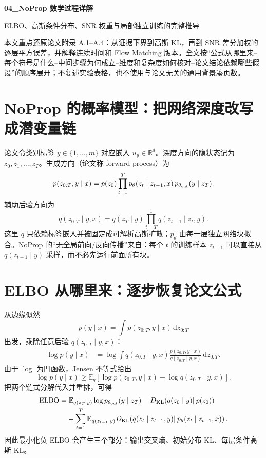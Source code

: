 \documentclass[UTF8,12pt,a4paper,fontset=none]{ctexart}
\numberwithin{equation}{section}
\newcommand{\R}{\mathbb{R}}
\newcommand{\E}{\mathbb{E}}
\newcommand{\KL}{D_{\mathrm{KL}}}
\newcommand{\dd}{\mathrm{d}}
\begin{document}
\begin{center}
{\LARGE\bfseries 04\_NoProp 数学过程详解}\par
\vspace{0.35em}
{\large ELBO、高斯条件分布、SNR 权重与局部独立训练的完整推导}
\end{center}
\vspace{0.45em}
\begin{keybox}[本文只处理真正需要推导的部分]
本文重点还原论文附录 A.1--A.4：从证据下界到高斯 KL，再到 SNR 差分加权的逐层平方误差，并解释连续时间和 Flow Matching 版本。全文按“公式从哪里来--每个符号是什么--中间步骤为何成立--维度和复杂度如何核对--论文结论依赖哪些假设”的顺序展开；不复述实验表格，也不使用与论文无关的通用背景凑页数。
\end{keybox}
\tableofcontents
\newpage

\section{NoProp 的概率模型：把网络深度改写成潜变量链}
论文令类别标签 $y\in\{1,\ldots,m\}$ 对应嵌入 $u_y\in\R^d$。深度方向的隐状态记为 $z_0,z_1,\ldots,z_T$。生成方向（论文称 forward process）为
\begin{equation}
 p(z_{0:T},y\mid x)=p(z_0)\prod_{t=1}^{T}p_\theta(z_t\mid z_{t-1},x)\,p_{\theta_{\rm out}}(y\mid z_T).
\end{equation}
辅助后验方向为
\begin{equation}
 q(z_{0:T}\mid y,x)=q(z_T\mid y)\prod_{t=T}^{1}q(z_{t-1}\mid z_t,y).
\end{equation}
这里 $q$ 只依赖标签嵌入并被固定成可解析高斯扩散；$p_\theta$ 由每一层独立网络块拟合。NoProp 的“无全局前向/反向传播”来自：每个 $t$ 的训练样本 $z_{t-1}$ 可以直接从 $q(z_{t-1}\mid y)$ 采样，而不必先运行前面所有块。

\section{ELBO 从哪里来：逐步恢复论文公式}
从边缘似然
\begin{equation}
 p(y\mid x)=\int p(z_{0:T},y\mid x)\,\dd z_{0:T}
\end{equation}
出发，乘除任意后验 $q(z_{0:T}\mid y,x)$：
\begin{align}
 \log p(y\mid x)
 &=\log\int q(z_{0:T}\mid y,x)
 \frac{p(z_{0:T},y\mid x)}{q(z_{0:T}\mid y,x)}\,\dd z_{0:T}.
\end{align}
由于 $\log$ 为凹函数，Jensen 不等式给出
\begin{equation}
 \boxed{\log p(y\mid x)\ge
 \E_q\left[\log p(z_{0:T},y\mid x)-\log q(z_{0:T}\mid y,x)\right].}
\end{equation}
把两个链式分解代入并重排，可得
\begin{align}
 \operatorname{ELBO}
 =&\;\E_{q(z_T\mid y)}\log p_{\theta_{\rm out}}(y\mid z_T)
 -\KL\!\left(q(z_0\mid y)\Vert p(z_0)\right)\\
 &-\sum_{t=1}^{T}\E_{q(z_{t-1}\mid y)}
 \KL\!\left(q(z_t\mid z_{t-1},y)\Vert p_\theta(z_t\mid z_{t-1},x)\right).
\end{align}
因此最小化负 ELBO 会产生三个部分：输出交叉熵、初始分布 KL、每层条件高斯 KL。
\end{document}

